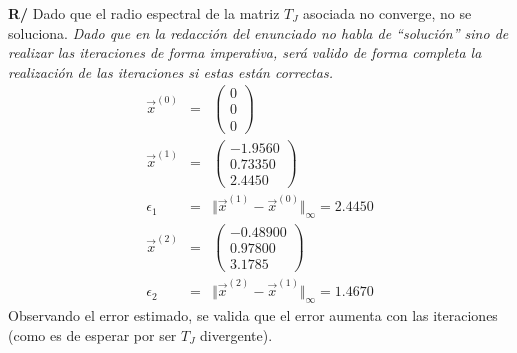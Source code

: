\documentclass[12pt]{article}
\begin{document}
\begin{enumerate}[leftmargin=*,widest=9]
\begin{enumerate}[label=\alph*]
\textbf{R/} Dado que el radio espectral de la matriz \(T_J\) asociada no converge, no se soluciona.
  \textit{Dado que en la redacción del enunciado no habla de ``solución'' sino de realizar las iteraciones de forma imperativa, será valido de forma completa la realización de las iteraciones si estas están correctas.}
  \begin{eqnarray*}
   \vec{x}^{(0)} & = & \begin{pmatrix}
    0 \\ 0 \\ 0
    \end{pmatrix} \\
    \vec{x}^{(1)} & = & \begin{pmatrix}
    -1.9560 \\ 0.73350 \\ 2.4450
    \end{pmatrix} \\
    \epsilon_1 & = & \Vert \vec{x}^{(1)} - \vec{x}^{(0)} \Vert_\infty = 2.4450\\
    \vec{x}^{(2)} & = & \begin{pmatrix}
    -0.48900 \\ 0.97800 \\ 3.1785
    \end{pmatrix} \\
    \epsilon_2 & = & \Vert \vec{x}^{(2)} - \vec{x}^{(1)} \Vert_\infty = 1.4670
  \end{eqnarray*}
  Observando el error estimado, se valida que el error aumenta con las iteraciones (como es de esperar por ser \(T_J\) divergente).
\end{enumerate}
  \end{enumerate}
\end{document}
